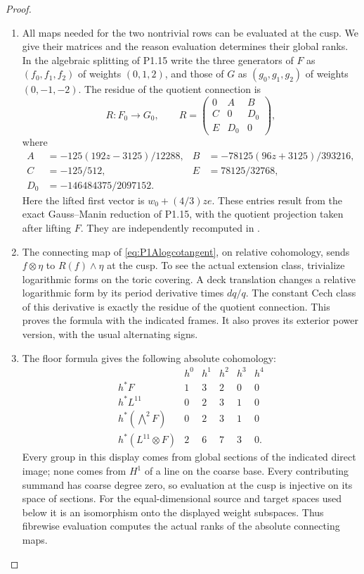 \begin{proof}
\begin{enumerate}[label=\arabic*.]
\item All maps needed for the two nontrivial rows can be evaluated at
the cusp. We give their matrices and the reason evaluation
determines their global ranks. In the algebraic splitting of
P1.15 write the three generators of $F$ as $(f_0,f_1,f_2)$ of
weights $(0,1,2)$, and those of $G$ as $(g_0,g_1,g_2)$ of
weights $(0,-1,-2)$. The residue of the quotient connection is
\[
R:F_0\longrightarrow G_0,\qquad
R=\begin{pmatrix}0&A&B\\C&0&D_0\\E&D_0&0\end{pmatrix},
\]
where
\begin{align*}
A&=-125(192z-3125)/12288,&
B&=-78125(96z+3125)/393216,\\
C&=-125/512,&E&=78125/32768,\\
D_0&=-146484375/2097152.
\end{align*}
Here the lifted first vector is $w_0+(4/3)ze$.
These entries result from the exact Gauss--Manin reduction of
P1.15, with the quotient projection taken after lifting $F$.
They are independently recomputed in
.

\item The connecting map of \eqref{eq:P1Alogcotangent}, on relative
cohomology, sends $f\otimes\eta$ to $R(f)\wedge\eta$ at the
cusp. To see the actual extension class, trivialize logarithmic
forms on the toric covering. A deck translation changes a
relative logarithmic form by its period derivative times
$dq/q$. The constant Cech class of this derivative is exactly
the residue of the quotient connection. This proves the
formula with the indicated frames. It also proves its exterior
power version, with the usual alternating signs.

\item The floor formula gives the following absolute cohomology:
\[
\begin{array}{c|ccccc}
&h^0&h^1&h^2&h^3&h^4\\\hline
h^*F&1&3&2&0&0\\
h^*L^{11}&0&2&3&1&0\\
h^*(\bigwedge^2F)&0&2&3&1&0\\
h^*(L^{11}\otimes F)&2&6&7&3&0.
\end{array}
\]
Every group in this display comes from global sections of the
indicated direct image; none comes from $H^1$ of a line on the
coarse base. Every contributing summand has coarse degree zero,
so evaluation at the cusp is injective on its space of sections.
For the equal-dimensional source and target spaces used below
it is an isomorphism onto the displayed weight subspaces.
Thus fibrewise evaluation computes the actual ranks of the
absolute connecting maps.


\end{enumerate}
\end{proof}
